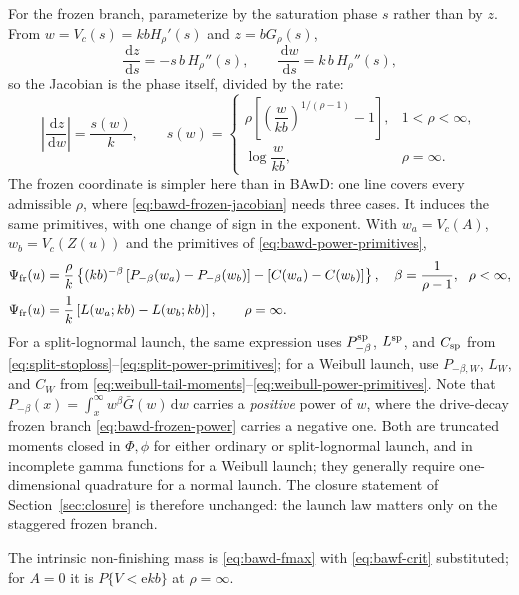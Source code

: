 \documentclass[12pt]{article}
\newcommand{\dd}{\,\mathrm{d}}
\newcommand{\PhiN}{\Phi}
\newcommand{\phiN}{\phi}
\newcommand{\Gbar}{\bar{G}}
\newcommand{\e}{\mathrm{e}}
\theoremstyle{remark}
\begin{document}
For the frozen branch, parameterize by the saturation phase $s$ rather than by $z$. From $w = V_c(s) = kbH_\rho'(s)$ and $z = bG_\rho(s)$,
\[
  \frac{\dd z}{\dd s} = -s\,b\,H_\rho''(s),
  \qquad
  \frac{\dd w}{\dd s} = k\,b\,H_\rho''(s),
\]
so the Jacobian is the phase itself, divided by the rate:
\begin{equation}
  \left|\frac{\dd z}{\dd w}\right| = \frac{s(w)}{k},
  \qquad
  s(w) =
  \begin{cases}
    \rho\left[\left(\dfrac{w}{kb}\right)^{1/(\rho-1)}-1\right],
      & 1<\rho<\infty,\\[10pt]
    \log\dfrac{w}{kb}, & \rho=\infty.
  \end{cases}
  \label{eq:bawf-frozen-jacobian}
\end{equation}
The frozen coordinate is simpler here than in BAwD: one line covers every admissible $\rho$, where \eqref{eq:bawd-frozen-jacobian} needs three cases. It induces the same primitives, with one change of sign in the exponent. With $w_a=V_c(A)$, $w_b=V_c(Z(u))$ and the primitives of \eqref{eq:bawd-power-primitives},
\begin{align}
  \Psi_{\rm fr}(u)
  &= \frac{\rho}{k}\left\{
       (kb)^{-\beta}\left[P_{-\beta}(w_a)-P_{-\beta}(w_b)\right]
       -\left[C(w_a)-C(w_b)\right]\right\},
     \quad \beta=\frac{1}{\rho-1},\ \ \rho<\infty,
     \nonumber\\
  \Psi_{\rm fr}(u)
  &= \frac{1}{k}\left[L(w_a;kb)-L(w_b;kb)\right],
     \qquad \rho=\infty.
  \label{eq:bawf-frozen}
\end{align}
For a split-lognormal launch, the same expression uses $P_{-\beta}^{\rm sp}$, $L^{\rm sp}$, and $C_{\rm sp}$ from
\eqref{eq:split-stoploss}--\eqref{eq:split-power-primitives}; for a Weibull
launch, use $P_{-\beta,W}$, $L_W$, and $C_W$ from
\eqref{eq:weibull-tail-moments}--\eqref{eq:weibull-power-primitives}.
Note that $P_{-\beta}(x)=\int_x^\infty w^{\beta}\Gbar(w)\dd w$ carries a \emph{positive} power of $w$, where the drive-decay frozen branch
\eqref{eq:bawd-frozen-power} carries a negative one. Both are truncated
moments closed in $\PhiN,\phiN$ for either ordinary or split-lognormal launch, and in incomplete gamma functions for a Weibull launch; they generally require one-dimensional quadrature for a normal launch. The closure statement of Section~\ref{sec:closure} is therefore unchanged: the launch law matters only on the staggered frozen branch.

The intrinsic non-finishing mass is \eqref{eq:bawd-fmax} with
\eqref{eq:bawf-crit} substituted; for $A=0$ it is $P\{V<\e kb\}$ at
$\rho=\infty$.
\end{document}
